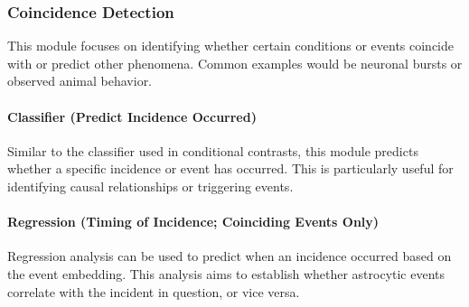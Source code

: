 
\subsubsection{Coincidence Detection}
This module focuses on identifying whether certain conditions or events coincide with or predict other phenomena. Common examples would be neuronal bursts or observed animal behavior.

\paragraph{Classifier (Predict Incidence Occurred)}
Similar to the classifier used in conditional contrasts, this module predicts whether a specific incidence or event has occurred. This is particularly useful for identifying causal relationships or triggering events.


\paragraph{Regression (Timing of Incidence; Coinciding Events Only)}
Regression analysis can be used to predict when an incidence occurred based on the event embedding. This analysis aims to establish whether astrocytic events correlate with the incident in question, or vice versa.

